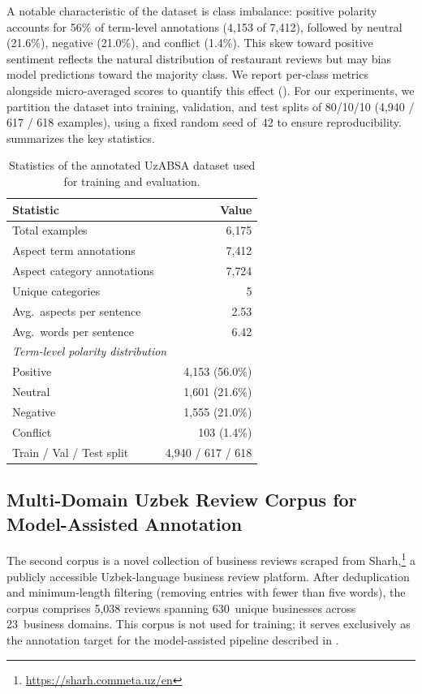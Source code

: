 \documentclass[runningheads]{llncs}
\begin{document}
A notable characteristic of the dataset is class imbalance: positive polarity accounts for 56\% of term-level annotations (4{,}153 of 7{,}412), followed by neutral (21.6\%), negative (21.0\%), and conflict (1.4\%). This skew toward positive sentiment reflects the natural distribution of restaurant reviews but may bias model predictions toward the majority class. We report per-class metrics alongside micro-averaged scores to quantify this effect (). For our experiments, we partition the dataset into training, validation, and test splits of 80/10/10 (4{,}940 / 617 / 618 examples), using a fixed random seed of~42 to ensure reproducibility.  summarizes the key statistics.

\begin{table}[t]
\centering
\caption{Statistics of the annotated UzABSA dataset used for training and evaluation.}
\label{tab:dataset_stats}
\begin{tabular}{lr}
\toprule
\textbf{Statistic} & \textbf{Value} \\
\midrule
Total examples & 6{,}175 \\
Aspect term annotations & 7{,}412 \\
Aspect category annotations & 7{,}724 \\
Unique categories & 5 \\
Avg.\ aspects per sentence & 2.53 \\
Avg.\ words per sentence & 6.42 \\
\midrule
\multicolumn{2}{l}{\textit{Term-level polarity distribution}} \\
\quad Positive & 4{,}153 (56.0\%) \\
\quad Neutral & 1{,}601 (21.6\%) \\
\quad Negative & 1{,}555 (21.0\%) \\
\quad Conflict & 103 (1.4\%) \\
\midrule
Train / Val / Test split & 4{,}940 / 617 / 618 \\
\bottomrule
\end{tabular}
\end{table}

\subsection{Multi-Domain Uzbek Review Corpus for Model-Assisted Annotation}
\label{sec:data_multidomain}

The second corpus is a novel collection of business reviews scraped from Sharh,\footnote{\url{https://sharh.commeta.uz/en}} a publicly accessible Uzbek-language business review platform. After deduplication and minimum-length filtering (removing entries with fewer than five words), the corpus comprises 5{,}038 reviews spanning 630~unique businesses across 23~business domains. This corpus is not used for training; it serves exclusively as the annotation target for the model-assisted pipeline described in .
\end{document}

